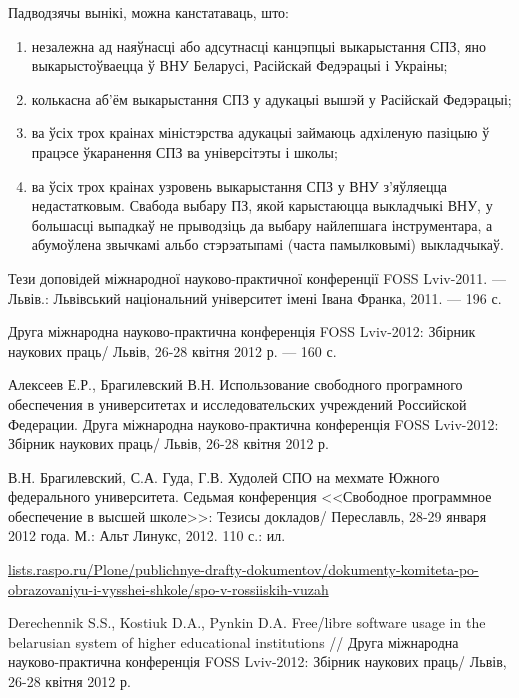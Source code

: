\documentclass[10pt, a5paper]{article}
\begin{document}
Падводзячы вынікі, можна канстатаваць, што:

\begin{enumerate}
  \item незалежна ад наяўнасці або адсутнасці канцэпцыі выкарыстання СПЗ, яно
  выкарыстоўваецца ў ВНУ Беларусі, Расійскай Федэрацыі і Украіны;
  \item колькасна аб'ём выкарыстання СПЗ у адукацыі вышэй у Расійскай Федэрацыі;
  \item ва ўсіх трох краінах міністэрства адукацыі займаюць адхіленую пазіцыю ў
  працэсе ўкаранення СПЗ ва універсітэты і школы;
  \item ва ўсіх трох краінах узровень выкарыстання СПЗ у ВНУ з'яў\-ляец\-ца
  недастатковым. Свабода выбару ПЗ, якой карыстаюцца выкладчыкі ВНУ, у большасці
  выпадкаў не прыводзіць да выбару найлепшага інструментара, а абумоўлена
  звычкамі альбо стэрэатыпамі (часта памылковымі) выкладчыкаў.
\end{enumerate}

\begin{thebibliography}{9}

 Тези доповідей міжнародної науково-практичної конференції FOSS Lviv-2011. ---
Львів.: Львівський національний університет імені Івана Франка, 2011. --- 196 с.

 Друга міжнародна науково-практична конференція FOSS Lviv-2012: Збірник
наукових праць/ Львів, 26-28 квітня 2012 р. --- 160 с.

 Алексеев Е.Р., Брагилевский В.Н. Использование свободного програмного
обеспечения в университетах и исследовательских учреждений Российской
Федерации. Друга міжнародна науково-практична конференція FOSS Lviv-2012: Збірник
наукових праць/ Львів, 26-28 квітня 2012 р.

 В.Н. Брагилевский, С.А. Гуда, Г.В. Худолей СПО на мехмате Южного
федерального университета. Седьмая конференция <<Свободное программное
обеспечение в высшей школе>>: Тезисы докладов/ Переславль, 28-29 января 2012 года. М.:
Альт Линукс, 2012. 110 с.: ил.

 \url{lists.raspo.ru/Plone/publichnye-drafty-dokumentov/dokumenty-komiteta-po-obrazovaniyu-i-vysshei-shkole/spo-v-rossiiskih-vuzah}

 Derechennik S.S., Kostiuk D.A., Pynkin D.A. Free/libre software usage in the belarusian system of higher educational
institutions // Друга міжнародна науково-практична конференція FOSS Lviv-2012: Збірник
наукових праць/ Львів, 26-28 квітня 2012 р.

\end{thebibliography}
\end{document}
